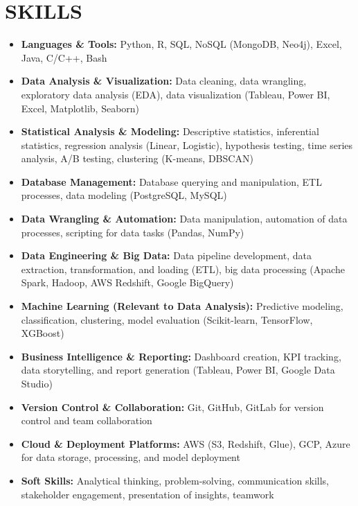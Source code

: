 \documentclass[12pt,a4paper]{article}
\begin{document}
\section*{SKILLS}
\begin{itemize}[leftmargin=*,noitemsep,topsep=0pt]
\item \textbf{Languages \& Tools:} Python, R, SQL, NoSQL (MongoDB, Neo4j), Excel, Java, C/C++, Bash
\item \textbf{Data Analysis \& Visualization:} Data cleaning, data wrangling, exploratory data analysis (EDA), data visualization (Tableau, Power BI, Excel, Matplotlib, Seaborn)
\item \textbf{Statistical Analysis \& Modeling:} Descriptive statistics, inferential statistics, regression analysis (Linear, Logistic), hypothesis testing, time series analysis, A/B testing, clustering (K-means, DBSCAN)
\item \textbf{Database Management:} Database querying and manipulation, ETL processes, data modeling (PostgreSQL, MySQL)
\item \textbf{Data Wrangling \& Automation:} Data manipulation, automation of data processes, scripting for data tasks (Pandas, NumPy)
\item \textbf{Data Engineering \& Big Data:} Data pipeline development, data extraction, transformation, and loading (ETL), big data processing (Apache Spark, Hadoop, AWS Redshift, Google BigQuery)
\item \textbf{Machine Learning (Relevant to Data Analysis):} Predictive modeling, classification, clustering, model evaluation (Scikit-learn, TensorFlow, XGBoost)
\item \textbf{Business Intelligence \& Reporting:} Dashboard creation, KPI tracking, data storytelling, and report generation (Tableau, Power BI, Google Data Studio)
\item \textbf{Version Control \& Collaboration:} Git, GitHub, GitLab for version control and team collaboration
\item \textbf{Cloud \& Deployment Platforms:} AWS (S3, Redshift, Glue), GCP, Azure for data storage, processing, and model deployment
\item \textbf{Soft Skills:} Analytical thinking, problem-solving, communication skills, stakeholder engagement, presentation of insights, teamwork
\end{itemize}
\end{document}
